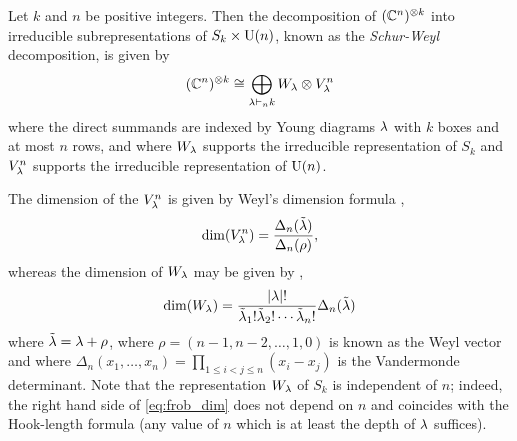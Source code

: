 \documentclass[notitlepage, 10pt]{article}
\begin{document}
\begin{prop}
    Let $k$ and $n$ be positive integers.
    Then the decomposition of $(\mathbb C^{n})^{\otimes k}$ into irreducible subrepresentations of $S_k \times \operatorname{U}(n)$, known as the \textit{Schur-Weyl} decomposition, is given by
    \begin{equation}
        \label{eq:schur_weyl_decomp}
        (\mathbb C^{n})^{\otimes k} \cong \bigoplus_{\lambda \vdash_{n} k} W_{\lambda} \otimes V_{\lambda}^{n}
    \end{equation}
    where the direct summands are indexed by Young diagrams $\lambda$ with $k$ boxes and at most $n$ rows, and where $W_{\lambda}$ supports the irreducible representation of $S_k$ and $V_{\lambda}^{n}$ supports the irreducible representation of $\operatorname{U}(n)$.
\end{prop}

The dimension of the $V_{\lambda}^n$ is given by Weyl's dimension formula \cite{hall2008representations,itzykson1966unitary},
\begin{equation}
    \label{eq:weyl_dim}
    \dim(V_{\lambda}^{n}) = \frac{\Delta_n(\tilde {\lambda})}{\Delta_n(\rho)},
\end{equation}
whereas the dimension of $W_{\lambda}$ may be given by \cite[Corollary 9.1.5]{goodman2000representations},
\begin{equation}
    \label{eq:frob_dim}
    \dim(W_{\lambda}) = \frac{\left|\lambda\right|!}{\tilde {\lambda}_1!\tilde {\lambda}_2! \cdots \tilde {\lambda}_n!} \Delta_n(\tilde {\lambda})
\end{equation}
where $\tilde {\lambda} = \lambda + \rho$, where $\rho =(n-1, n-2, \ldots, 1, 0)$ is known as the Weyl vector and where $\Delta_n(x_1, \ldots, x_n) = \prod_{1 \leq i < j \leq n} (x_i-x_j)$ is the Vandermonde determinant.
Note that the representation $W_{\lambda}$ of $S_{k}$ is independent of $n$;
indeed, the right hand side of \cref{eq:frob_dim} does not depend on $n$ and coincides with the Hook-length formula \cite[Corollary 9.1.6]{goodman2000representations} (any value of $n$ which is at least the depth of $\lambda$ suffices).
\end{document}
